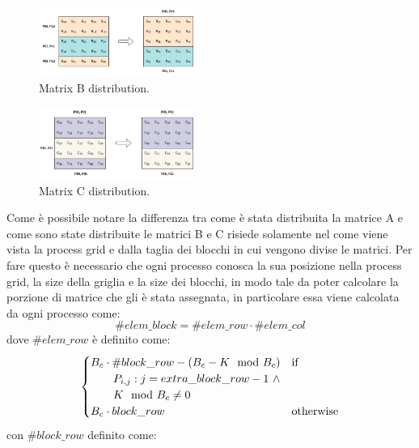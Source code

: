 \documentclass[conference]{IEEEtran}
\begin{document}
\begin{figure}[H]
    \raggedright
    \includegraphics[width=0.45\textwidth]{resources/matrixB_row_block_cyclic_distribution.jpg}
    \caption{Matrix B distribution.}
    \label{fig:matrix_b_distribution}
\end{figure}
\begin{figure}[H]
    \raggedright
    \includegraphics[width=0.45\textwidth]{resources/matrixC_row_block_cyclic_distribution.jpg}
    \caption{Matrix C distribution.}
    \label{fig:matrix_c_distribution}
\end{figure}
Come è possibile notare la differenza tra come è stata distribuita la matrice A e come sono state distribuite le matrici B e C risiede solamente nel come viene vista la process grid e dalla taglia dei blocchi in cui vengono divise le matrici.
Per fare questo è necessario che ogni processo conosca la sua posizione nella process grid, la size della griglia e la size dei blocchi, in modo tale da poter calcolare la porzione di matrice che gli è stata assegnata, in particolare essa viene calcolata da ogni processo come:
\begin{equation}
    \#elem\_block=\#elem\_row\cdot \#elem\_col
\end{equation}
dove $\#elem\_row$ è definito come:
\begin{equation}
    \begin{cases}
        B_c\cdot \#block\_row-(B_c-K \mod B_c) &  \text{if}\ \\
        \text{\quad}\text{\quad} P_{i,j} : j=extra\_block\_row-1 \ \land \\ 
        \text{\quad} \text{\quad}K \mod B_c \neq 0\\
        B_c\cdot block\_row & \text{otherwise}\\
    \end{cases} 
\end{equation}
con $\#block\_row$ definito come:
\end{document}
